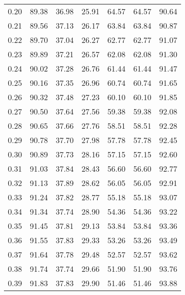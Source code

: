 \begin{tabular}{|c|c|c|c|c|c|c|}
      0.20 &     89.38 &     36.98 &      25.91 &   64.57 &      64.57 &         90.64 \\
      0.21 &     89.56 &     37.13 &      26.17 &   63.84 &      63.84 &         90.87 \\
      0.22 &     89.70 &     37.04 &      26.27 &   62.77 &      62.77 &         91.07 \\
      0.23 &     89.89 &     37.21 &      26.57 &   62.08 &      62.08 &         91.30 \\
      0.24 &     90.02 &     37.28 &      26.76 &   61.44 &      61.44 &         91.47 \\
      0.25 &     90.16 &     37.35 &      26.96 &   60.74 &      60.74 &         91.65 \\
      0.26 &     90.32 &     37.48 &      27.23 &   60.10 &      60.10 &         91.85 \\
      0.27 &     90.50 &     37.64 &      27.56 &   59.38 &      59.38 &         92.08 \\
      0.28 &     90.65 &     37.66 &      27.76 &   58.51 &      58.51 &         92.28 \\
      0.29 &     90.78 &     37.70 &      27.98 &   57.78 &      57.78 &         92.45 \\
      0.30 &     90.89 &     37.73 &      28.16 &   57.15 &      57.15 &         92.60 \\
      0.31 &     91.03 &     37.84 &      28.43 &   56.60 &      56.60 &         92.77 \\
      0.32 &     91.13 &     37.89 &      28.62 &   56.05 &      56.05 &         92.91 \\
      0.33 &     91.24 &     37.82 &      28.77 &   55.18 &      55.18 &         93.07 \\
      0.34 &     91.34 &     37.74 &      28.90 &   54.36 &      54.36 &         93.22 \\
      0.35 &     91.45 &     37.81 &      29.13 &   53.84 &      53.84 &         93.36 \\
      0.36 &     91.55 &     37.83 &      29.33 &   53.26 &      53.26 &         93.49 \\
      0.37 &     91.64 &     37.78 &      29.48 &   52.57 &      52.57 &         93.62 \\
      0.38 &     91.74 &     37.74 &      29.66 &   51.90 &      51.90 &         93.76 \\
      0.39 &     91.83 &     37.83 &      29.90 &   51.46 &      51.46 &         93.88 \\

\end{tabular}
